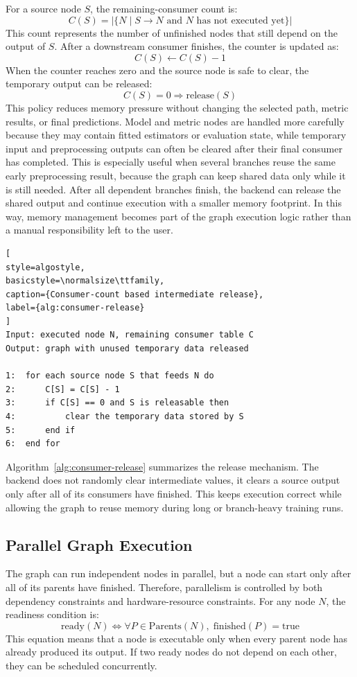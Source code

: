 \documentclass[12pt,a4paper,oneside]{report}
\begin{document}
For a source node \(S\), the remaining-consumer count is:
\[
C(S) = |\{N \mid S \rightarrow N \text{ and } N \text{ has not executed yet}\}|
\]
This count represents the number of unfinished nodes that still depend on the
output of \(S\). After a downstream consumer finishes, the counter is updated as:
\[
C(S) \leftarrow C(S) - 1
\]
When the counter reaches zero and the source node is safe to clear, the temporary
output can be released:
\[
C(S)=0 \Rightarrow \text{release}(S)
\]
This policy reduces memory pressure without changing the selected path, metric
results, or final predictions. Model and metric nodes are handled more carefully
because they may contain fitted estimators or evaluation state, while temporary
input and preprocessing outputs can often be cleared after their final consumer
has completed. This is especially useful when several branches reuse the same
early preprocessing result, because the graph can keep shared data only while it
is still needed. After all dependent branches finish, the backend can release the
shared output and continue execution with a smaller memory footprint. In this
way, memory management becomes part of the graph execution logic rather than a
manual responsibility left to the user.


\begin{lstlisting}[
style=algostyle,
basicstyle=\normalsize\ttfamily,
caption={Consumer-count based intermediate release},
label={alg:consumer-release}
]
Input: executed node N, remaining consumer table C
Output: graph with unused temporary data released

1:  for each source node S that feeds N do
2:      C[S] = C[S] - 1
3:      if C[S] == 0 and S is releasable then
4:          clear the temporary data stored by S
5:      end if
6:  end for
\end{lstlisting}

Algorithm~\ref{alg:consumer-release} summarizes the release mechanism. The
backend does not randomly clear intermediate values, it clears a source output
only after all of its consumers have finished. This keeps execution correct while
allowing the graph to reuse memory during long or branch-heavy training runs.


\subsection{Parallel Graph Execution}
The graph can run independent nodes in parallel, but a node can start only after
all of its parents have finished. Therefore, parallelism is controlled by both
dependency constraints and hardware-resource constraints. For any node \(N\), the
readiness condition is:
\[
\text{ready}(N) \Longleftrightarrow \forall P \in \text{Parents}(N),\; \text{finished}(P)=\text{true}
\]
This equation means that a node is executable only when every parent node has
already produced its output. If two ready nodes do not depend on each other, they
can be scheduled concurrently.
\end{document}
